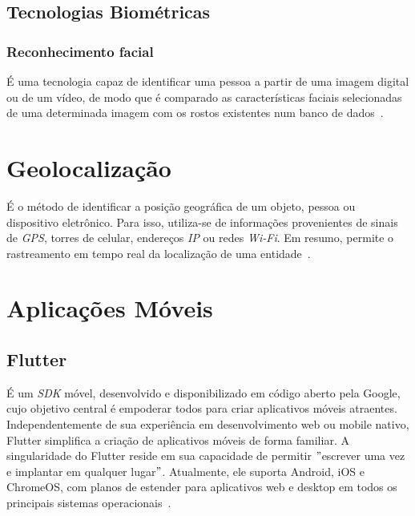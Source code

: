 \subsection{Tecnologias Biométricas}\label{subsec:biometria-tecnologias}

\subsubsection{Reconhecimento facial}\label{subsubsec:reconhecimento-facial}
É uma tecnologia capaz de identificar uma pessoa a partir de uma imagem digital ou de um vídeo, de modo que é comparado as características faciais selecionadas de uma determinada imagem com os rostos existentes num banco de dados~\cite{orvalho2019reconhecimento}.




\section{Geolocalização}\label{sec:geolocalizacao}
É o método de identificar a posição geográfica de um objeto, pessoa ou dispositivo eletrônico.
Para isso, utiliza-se de informações provenientes de sinais de \textit{GPS}, torres de celular, endereços \textit{IP} ou redes  \textit{Wi-Fi}.
Em resumo, permite o rastreamento em tempo real da localização de uma entidade~\cite{da2019sistemas}.


\section{Aplicações Móveis}\label{sec:aplicacoes-moveis}

\subsection{Flutter}\label{subsec:flutter}
É um \textit{SDK} móvel, desenvolvido e disponibilizado em código aberto pela Google, cujo objetivo central é empoderar todos para criar aplicativos móveis atraentes.
Independentemente de sua experiência em desenvolvimento web ou mobile nativo, Flutter simplifica a criação de aplicativos móveis de forma familiar.
A singularidade do Flutter reside em sua capacidade de permitir \("\)escrever uma vez e implantar em qualquer lugar\("\).
Atualmente, ele suporta Android, iOS e ChromeOS, com planos de estender para aplicativos web e desktop em todos os principais sistemas operacionais~\cite{windmill2020flutter}.


